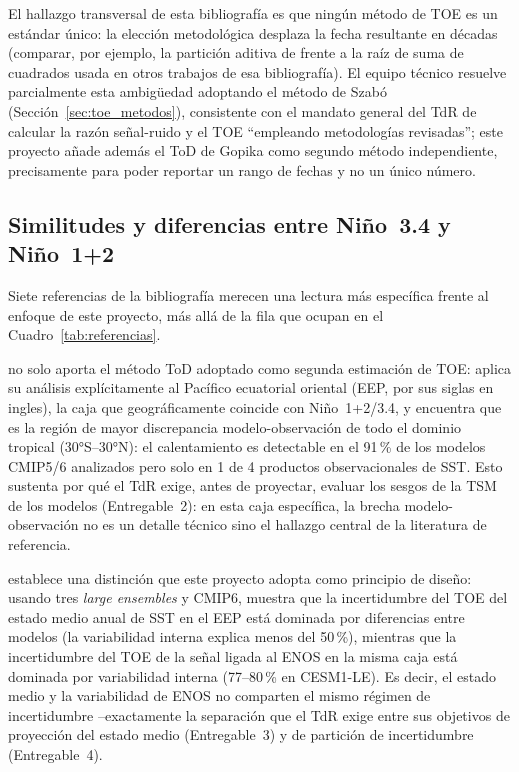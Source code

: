 \documentclass[11pt,a4paper]{article}
\begin{document}
El hallazgo transversal de esta bibliograf\'ia es que ning\'un m\'etodo de TOE es un est\'andar \'unico: la elecci\'on metodol\'ogica desplaza la fecha resultante en d\'ecadas (comparar, por ejemplo, la partici\'on aditiva de \citealp{szabo2016} frente a la ra\'iz de suma de cuadrados usada en otros trabajos de esa bibliograf\'ia). El equipo t\'ecnico resuelve parcialmente esta ambig\"uedad adoptando el m\'etodo de Szab\'o (Secci\'on~\ref{sec:toe_metodos}), consistente con el mandato general del TdR de calcular la raz\'on se\~nal-ruido y el TOE ``empleando metodolog\'ias revisadas''; este proyecto a\~nade adem\'as el ToD de Gopika como segundo m\'etodo independiente, precisamente para poder reportar un rango de fechas y no un \'unico n\'umero.

\subsection{Similitudes y diferencias entre Ni\~no~3.4 y Ni\~no~1+2}
\label{sec:similitudes}

Siete referencias de la bibliografía merecen una lectura más específica frente al enfoque de este proyecto, más allá de la fila que ocupan en el Cuadro~\ref{tab:referencias}.

\citet{gopika2024} no solo aporta el método ToD adoptado como segunda estimación de TOE: aplica su análisis explícitamente al Pacífico ecuatorial oriental (EEP, por sus siglas en ingles), la caja que geográficamente coincide con Ni\~no~1+2/3.4, y encuentra que es la región de mayor discrepancia modelo-observación de todo el dominio tropical (30°S--30°N): el calentamiento es detectable en el 91\,\% de los modelos CMIP5/6 analizados pero solo en 1 de 4 productos observacionales de SST. Esto sustenta por qué el TdR exige, antes de proyectar, evaluar los sesgos de la TSM de los modelos (Entregable~2): en esta caja específica, la brecha modelo-observación no es un detalle técnico sino el hallazgo central de la literatura de referencia.

\citet{zhong2023} establece una distinción que este proyecto adopta como principio de diseño: usando tres \emph{large ensembles} y CMIP6, muestra que la incertidumbre del TOE del estado medio anual de SST en el EEP está dominada por diferencias entre modelos (la variabilidad interna explica menos del 50\,\%), mientras que la incertidumbre del TOE de la señal ligada al ENOS en la misma caja está dominada por variabilidad interna (77--80\,\% en CESM1-LE). Es decir, el estado medio y la variabilidad de ENOS no comparten el mismo régimen de incertidumbre --exactamente la separación que el TdR exige entre sus objetivos de proyección del estado medio (Entregable~3) y de partición de incertidumbre (Entregable~4).
\end{document}
